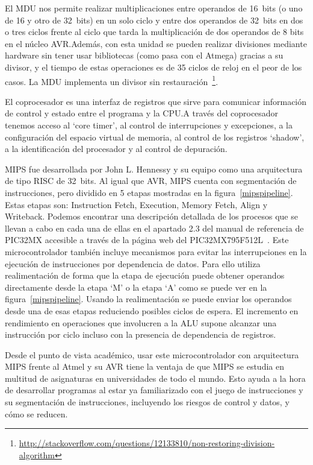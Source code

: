 El MDU nos permite realizar multiplicaciones entre operandos de 16~bits (o uno de 16 y otro de 32~bits) en un solo ciclo y entre dos operandos de 32~bits en dos o tres ciclos frente al ciclo que tarda la multiplicación de dos operandos de 8 bits en el núcleo AVR.\@ Además, con esta unidad se pueden realizar divisiones mediante hardware sin tener usar bibliotecas (como pasa con el Atmega) gracias a su divisor, y el tiempo de estas operaciones es de 35 ciclos de reloj en el peor de los casos. La MDU implementa un divisor sin restauración~\footnote{\url{http://stackoverflow.com/questions/12133810/non-restoring-division-algorithm}}.


El coprocesador es una interfaz de registros que sirve para comunicar información de control y estado entre el programa y la CPU.\@ A través del coprocesador tenemos acceso al `core timer', al control de interrupciones y excepciones, a la configuración del espacio virtual de memoria, al control de los registros `shadow', a la identificación del procesador y al control de depuración.


MIPS fue desarrollada por John L. Hennessy y su equipo como una arquitectura de tipo RISC de 32~bits. Al igual que AVR, MIPS cuenta con segmentación de instrucciones, pero dividido en 5 etapas mostradas en la figura~\ref{mipspipeline}. Estas etapas son: Instruction Fetch, Execution, Memory Fetch, Align y Writeback. Podemos encontrar una descripción detallada de los procesos que se llevan a cabo en cada una de ellas en el apartado 2.3 del manual de referencia de PIC32MX accesible a través de la página web del PIC32MX795F512L~\cite{website:pic32mx}. Este microcontrolador también incluye mecanismos para evitar las interrupciones en la ejecución de instrucciones por dependencia de datos. Para ello utiliza realimentación de forma que la etapa de ejecución puede obtener operandos directamente desde la etapa `M' o la etapa `A' como se puede ver en la figura~\ref{mipspipeline}. Usando la realimentación se puede enviar los operandos desde una de esas etapas reduciendo posibles ciclos de espera. El incremento en rendimiento en operaciones que involucren a la ALU supone alcanzar una instrucción por ciclo incluso con la presencia de dependencia de registros.

Desde el punto de vista académico, usar este microcontrolador con arquitectura MIPS frente al Atmel y su AVR tiene la ventaja de que MIPS se estudia en multitud de asignaturas en universidades de todo el mundo. Esto ayuda a la hora de desarrollar programas al estar ya familiarizado con el juego de instrucciones y su segmentación de instrucciones, incluyendo los riesgos de control y datos, y cómo se reducen.

